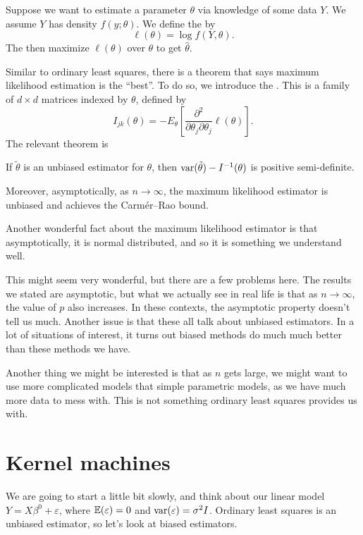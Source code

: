 \documentclass[a4paper]{article}
\begin{document}
Suppose we want to estimate a parameter $\theta$ via knowledge of some data $Y$. We assume $Y$ has density $f(y; \theta)$. We define the  by
\[
  \ell(\theta) = \log f(Y, \theta).
\]
The  then maximize $\ell(\theta)$ over $\theta$ to get $\hat{\theta}$.

Similar to ordinary least squares, there is a theorem that says maximum likelihood estimation is the ``best''. To do so, we introduce the . This is a family of $d \times d$ matrices indexed by $\theta$, defined by
\[
  I_{jk}(\theta) = - E_\theta\left[\frac{\partial^2}{\partial \theta_j \partial \theta_j} \ell(\theta)\right].
\]
The relevant theorem is
\begin{thm}
  If $\tilde{\theta}$ is an unbiased estimator for $\theta$, then $\operatorname{var}(\tilde{\theta}) - I^{-1}(\theta)$ is positive semi-definite.

  Moreover, asymptotically, as $n \to \infty$, the maximum likelihood estimator is unbiased and achieves the Carm\'er--Rao bound.
\end{thm}

Another wonderful fact about the maximum likelihood estimator is that asymptotically, it is normal distributed, and so it is something we understand well.

This might seem very wonderful, but there are a few problems here. The results we stated are asymptotic, but what we actually see in real life is that as $n \to \infty$, the value of $p$ also increases. In these contexts, the asymptotic property doesn't tell us much. Another issue is that these all talk about unbiased estimators. In a lot of situations of interest, it turns out biased methods do much much better than these methods we have.

Another thing we might be interested is that as $n$ gets large, we might want to use more complicated models that simple parametric models, as we have much more data to mess with. This is not something ordinary least squares provides us with.

\section{Kernel machines}
We are going to start a little bit slowly, and think about our linear model $Y = X\beta^0 + \varepsilon$, where $\mathbb{E}(\varepsilon) = 0$ and $\operatorname{var}(\varepsilon) = \sigma^2 I$. Ordinary least squares is an unbiased estimator, so let's look at biased estimators.
\end{document}
